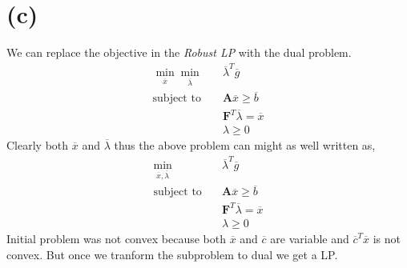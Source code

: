 \documentclass{article}
\begin{document}
\section*{(c)}
We can replace the objective in the \textit{Robust LP} with the dual problem.
\begin{equation*}
	\begin{aligned}
		\min _{\overline{x}} \min _{\overline{\lambda}} \quad & \overline{\lambda}^T\overline{g}\\
		\textrm{subject to} \quad & \mathbf{A}\overline{x} \ge \overline{b}\\
		& \mathbf{F}^T\overline{\lambda} = \overline{x}\\
		& \lambda \ge 0
	\end{aligned}
\end{equation*}
Clearly both $\overline{x}$ and $\overline{\lambda}$ thus the above problem can might as well written as,
 \begin{equation*}
	\begin{aligned}
		\min _{\overline{x}, \overline{\lambda}} \quad & \overline{\lambda}^T\overline{g}\\
		\textrm{subject to} \quad & \mathbf{A}\overline{x} \ge \overline{b}\\
		& \mathbf{F}^T\overline{\lambda} = \overline{x}\\
		& \lambda \ge 0
	\end{aligned}
\end{equation*}
Initial problem was not convex because both $\overline{x}$ and $\overline{c}$ are variable and $\overline{c}^T\overline{x}$ is not convex. But once we tranform the subproblem to dual we get a LP.
\end{document}
